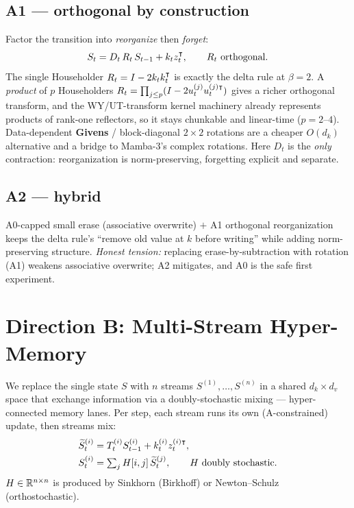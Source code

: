 \documentclass[11pt,letterpaper,logo]{yalearxiv}
\newcommand{\Tcarry}{T}          %
\begin{document}
\subsection{A1 --- orthogonal by construction}
Factor the transition into \emph{reorganize} then \emph{forget}:
\begin{equation}
  S_t = D_t\, R_t\, S_{t-1} + k_t z_t^{\intercal}, \qquad R_t \text{ orthogonal}.
  \label{eq:a1}
\end{equation}
The single Householder $R_t = I - 2 k_t k_t^{\intercal}$ is exactly the delta rule at
$\beta=2$. A \emph{product} of $p$ Householders
$R_t = \prod_{j \le p}(I - 2 u_t^{(j)} u_t^{(j)\intercal})$ gives a richer orthogonal
transform, and the WY/UT-transform kernel machinery already represents products of
rank-one reflectors, so it stays chunkable and linear-time ($p = 2\text{--}4$).
Data-dependent \textbf{Givens} / block-diagonal $2\times2$ rotations are a cheaper
$O(d_k)$ alternative and a bridge to Mamba-3's complex rotations. Here $D_t$ is the
\emph{only} contraction: reorganization is norm-preserving, forgetting explicit and
separate.

\subsection{A2 --- hybrid}
A0-capped small erase (associative overwrite) $+$ A1 orthogonal reorganization keeps
the delta rule's ``remove old value at $k$ before writing'' while adding
norm-preserving structure. \emph{Honest tension:} replacing erase-by-subtraction with
rotation (A1) weakens associative overwrite; A2 mitigates, and A0 is the safe first
experiment.


\section{Direction B: Multi-Stream Hyper-Memory}
\label{sec:dirB}

We replace the single state $S$ with $n$ streams $S^{(1)},\dots,S^{(n)}$ in a shared
$d_k\times d_v$ space that exchange information via a doubly-stochastic mixing ---
hyper-connected memory lanes. Per step, each stream runs its own
(A-constrained) update, then streams mix:
\begin{align}
  \widetilde{S}_t^{(i)} &= \Tcarry_t^{(i)} S_{t-1}^{(i)} + k_t^{(i)} z_t^{(i)\tr},
  \label{eq:b-stream}\\
  S_t^{(i)} &= \textstyle\sum_j H[i,j]\, \widetilde{S}_t^{(j)},
  \qquad H \text{ doubly stochastic}.
  \label{eq:b-mix}
\end{align}
$H \in \mathbb{R}^{n\times n}$ is produced by Sinkhorn (Birkhoff) or Newton--Schulz
(orthostochastic).
\end{document}
